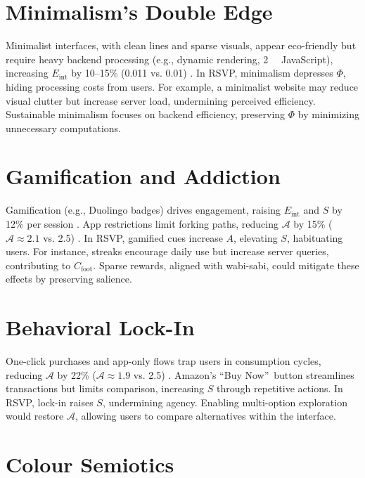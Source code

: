 \documentclass[openany]{book}
\newcommand{\PhiS}{\Phi} %
\newcommand{\Sent}{S} %
\newcommand{\Eint}{E_{\mathrm{int}}} %
\newcommand{\Cfoot}{C_{\mathrm{foot}}} %
\newcommand{\Auton}{\mathcal{A}} %
\newcommand{\kWh}{\mathrm{kWh}}
\begin{document}
\section{Minimalism’s Double Edge}
\label{sec:aesthetic-minimalism}
Minimalist interfaces, with clean lines and sparse visuals, appear eco-friendly but require heavy backend processing (e.g., dynamic rendering, \SI{2}{\mega\byte} JavaScript), increasing \(\Eint\) by 10--15\% (\SI{0.011}{\kWh} vs. \SI{0.01}{\kWh}) \citep{designlab2024,extentia2024}. In RSVP, minimalism depresses \(\PhiS\), hiding processing costs from users. For example, a minimalist website may reduce visual clutter but increase server load, undermining perceived efficiency. Sustainable minimalism focuses on backend efficiency, preserving \(\PhiS\) by minimizing unnecessary computations.

\section{Gamification and Addiction}
\label{sec:aesthetic-gamification}
Gamification (e.g., Duolingo badges) drives engagement, raising \(\Eint\) and \(\Sent\) by 12\% per session \citep{colak2024}. App restrictions limit forking paths, reducing \(\Auton\) by 15\% (\(\Auton \approx 2.1\) vs. 2.5) \citep{doctorow2022}. In RSVP, gamified cues increase \(A\), elevating \(\Sent\), habituating users. For instance, streaks encourage daily use but increase server queries, contributing to \(\Cfoot\). Sparse rewards, aligned with wabi-sabi, could mitigate these effects by preserving salience.

\section{Behavioral Lock-In}
\label{sec:aesthetic-lockin}
One-click purchases and app-only flows trap users in consumption cycles, reducing \(\Auton\) by 22\% (\(\Auton \approx 1.9\) vs. 2.5) \citep{doctorow2022}. Amazon’s \textquotedblleft Buy Now\textquotedblright\ button streamlines transactions but limits comparison, increasing \(\Sent\) through repetitive actions. In RSVP, lock-in raises \(\Sent\), undermining agency. Enabling multi-option exploration would restore \(\Auton\), allowing users to compare alternatives within the interface.

\section{Colour Semiotics}
\label{sec:color-semiotics}
\end{document}
